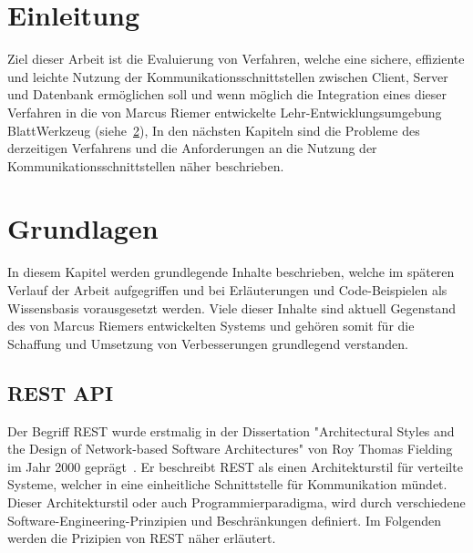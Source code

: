 
\chapter{Einleitung}
\label{sec:requirements}

Ziel dieser Arbeit ist die Evaluierung von Verfahren, welche eine sichere, effiziente und leichte Nutzung der Kommunikationsschnittstellen 
zwischen Client, Server und Datenbank ermöglichen soll und wenn möglich die Integration eines dieser Verfahren
in die von Marcus Riemer entwickelte Lehr-Entwicklungsumgebung BlattWerkzeug (siehe~\ref{sec:basics}),
In den nächsten Kapiteln sind die Probleme des derzeitigen Verfahrens und die Anforderungen an die Nutzung der Kommunikationsschnittstellen näher beschrieben.

\chapter{Grundlagen}
\label{sec:basics}
In diesem Kapitel werden grundlegende Inhalte beschrieben, welche im späteren Verlauf der Arbeit aufgegriffen 
und bei Erläuterungen und Code-Beispielen als Wissensbasis vorausgesetzt werden. Viele dieser Inhalte sind aktuell Gegenstand
des von Marcus Riemers entwickelten Systems und gehören somit für die Schaffung und Umsetzung von Verbesserungen grundlegend verstanden.
\section{REST API}
\label{sec:basics:restapi}
Der Begriff REST wurde erstmalig in der Dissertation "Architectural Styles and the Design of 
Network-based Software Architectures" von Roy Thomas Fielding im Jahr 2000 geprägt~\cite{fielding-dissertation}.
Er beschreibt REST als einen Architekturstil für verteilte Systeme, welcher in eine einheitliche Schnittstelle für Kommunikation mündet.
Dieser Architekturstil oder auch Programmierparadigma, wird durch verschiedene Software-Engineering-Prinzipien und Beschränkungen definiert.
Im Folgenden werden die Prizipien von REST näher erläutert.

